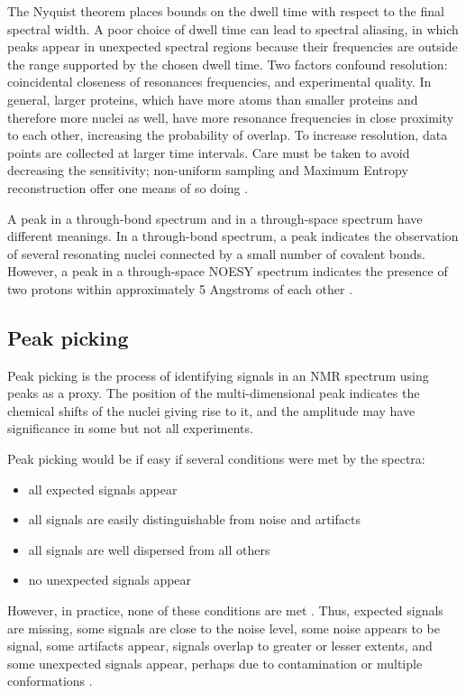 The Nyquist theorem \cite{nyquist1928certain, shannon1949communication}
places bounds on the dwell time with respect to the 
final spectral width.  A poor choice of dwell time can lead to spectral 
aliasing, in which peaks appear in unexpected spectral regions because their
frequencies are outside the range supported by the chosen dwell time.
Two factors confound resolution:  coincidental
closeness of resonances frequencies, and experimental quality.  In general, 
larger proteins, which have more atoms than smaller proteins and therefore
more nuclei as well, have more resonance
frequencies in close proximity to each other, increasing the probability of 
overlap.  To increase resolution, data points are collected at 
larger time intervals.  Care must be taken to avoid decreasing the sensitivity;
non-uniform sampling and Maximum Entropy reconstruction offer one means of so
doing \cite{rovnyak2004accelerated, hoch1985maximum}.

A peak in a through-bond spectrum and in a through-space spectrum have 
different meanings.  In a through-bond spectrum, a peak indicates the 
observation of several resonating nuclei connected by a small number of
covalent bonds.  However, a peak in a through-space NOESY spectrum indicates
the presence of two protons within approximately 5 Angstroms of each other
\cite{neuhaus1989nuclear}.

\subsection*{Peak picking}

Peak picking is the process of identifying signals in an NMR spectrum using
peaks as a proxy.  The position of the multi-dimensional peak indicates the
chemical shifts of the nuclei giving rise to it, and the amplitude may have
significance in some but not all experiments.

Peak picking would be if easy if several conditions were met by the spectra:

\begin{itemize}
  \item all expected signals appear
  \item all signals are easily distinguishable from noise and artifacts
  \item all signals are well dispersed from all others
  \item no unexpected signals appear
\end{itemize}
 
However, in practice, none of these conditions are met \cite{williamson2009automated}.  
Thus, expected signals are missing, some signals are close to the noise
level, some noise appears to be signal, some artifacts appear, signals overlap
to greater or lesser extents, and some unexpected signals appear, perhaps due
to contamination or multiple conformations \cite{baran2004automated}.

